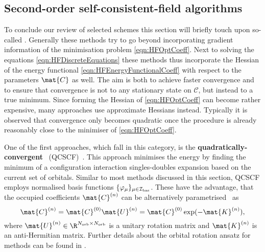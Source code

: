 \subsection{Second-order self-consistent-field algorithms}
\label{sec:SOSCF}

To conclude our review of selected \SCF schemes
this section will briefly touch upon so-called .
Generally these methods try to go beyond incorporating
gradient information of the \HF minimisation problem \eqref{eqn:HFOptCoeff}.
Next to solving the \HF equations \eqref{eqn:HFDiscreteEquations}
these methods thus incorporate the  Hessian
of the energy functional \eqref{eqn:HFEnergyFunctionalCoeff}
with respect to the parameters $\mat{C}$ as well.
The aim is both to achieve faster convergence
and to ensure that convergence is not to any stationary state on $\mathcal{C}$,
but instead to a true \SCF minimum.
Since forming the Hessian of \eqref{eqn:HFOptCoeff} can become rather expensive,
many approaches use approximate Hessians instead.
Typically it is observed
that convergence only becomes quadratic
once the \SCF procedure is already reasonably
close to the minimiser of \eqref{eqn:HFOptCoeff}.

One of the first approaches, which fall in this category,
is the \textbf{quadratically-convergent \SCF}~(QCSCF)~\cite{Bacskay1981}.
This approach minimises the \SCF energy by finding the minimum of a
configuration interaction singles-doubles expansion
based on the current set of \SCF orbitals.
Similar to most methods discussed in this section,
QCSCF employs normalised basis functions $\{\varphi_\mu\}_{\mu\in\mathcal{I}_\text{bas}}$.
These have the advantage, that the occupied \SCF coefficients $\mat{C}^{(n)}$
can be alternatively parametrised~\cite{Helgaker2013} as
\[ \mat{C}^{(n)} = \mat{C}^{(0)} \mat{U}^{(n)} = \mat{C}^{(0)} \exp(-\mat{K}^{(n)}), \]
where $\mat{U}^{(n)} \in \R^{\Norb \times \Norb}$ is a unitary rotation matrix
and $\mat{K}^{(n)}$ is an anti-Hermitian matrix.
Further details about the orbital rotation ansatz for \SCF methods
can be found in \cite{Helgaker2013}.

